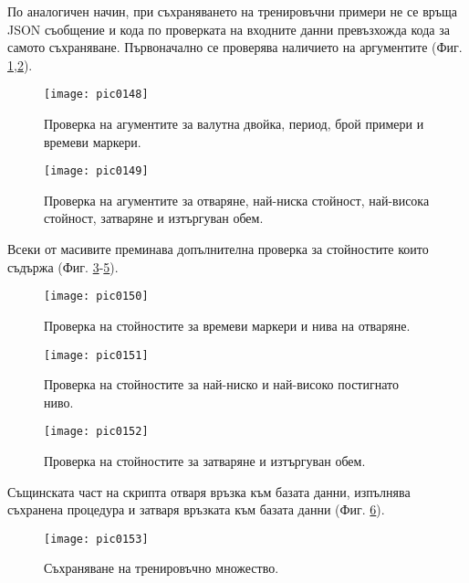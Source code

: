 По аналогичен начин, при съхраняването на тренировъчни примери не се връща JSON съобщение и кода по проверката на входните данни превъзхожда кода за самото съхраняване. Първоначално се проверява наличието на аргументите (Фиг. \ref{fig:pic0148},\ref{fig:pic0149}).

\begin{figure}[h]
  \centering
  \texttt{[image: pic0148]}
  \caption{Проверка на агументите за валутна двойка, период, брой примери и времеви маркери.}
\label{fig:pic0148}
\end{figure}
\FloatBarrier

\begin{figure}[h]
  \centering
  \texttt{[image: pic0149]}
  \caption{Проверка на агументите за отваряне, най-ниска стойност, най-висока стойност, затваряне и изтъргуван обем.}
\label{fig:pic0149}
\end{figure}
\FloatBarrier

Всеки от масивите преминава допълнителна проверка за стойностите които съдържа (Фиг. \ref{fig:pic0150}-\ref{fig:pic0152}).

\begin{figure}[h]
  \centering
  \texttt{[image: pic0150]}
  \caption{Проверка на стойностите за времеви маркери и нива на отваряне.}
\label{fig:pic0150}
\end{figure}
\FloatBarrier

\begin{figure}[h]
  \centering
  \texttt{[image: pic0151]}
  \caption{Проверка на стойностите за най-ниско и най-високо постигнато ниво.}
\label{fig:pic0151}
\end{figure}
\FloatBarrier

\begin{figure}[h]
  \centering
  \texttt{[image: pic0152]}
  \caption{Проверка на стойностите за затваряне и изтъргуван обем.}
\label{fig:pic0152}
\end{figure}
\FloatBarrier

Същинската част на скрипта отваря връзка към базата данни, изпълнява съхранена процедура и затваря връзката към базата данни (Фиг. \ref{fig:pic0153}).

\begin{figure}[h]
  \centering
  \texttt{[image: pic0153]}
  \caption{Съхраняване на тренировъчно множество.}
\label{fig:pic0153}
\end{figure}
\FloatBarrier